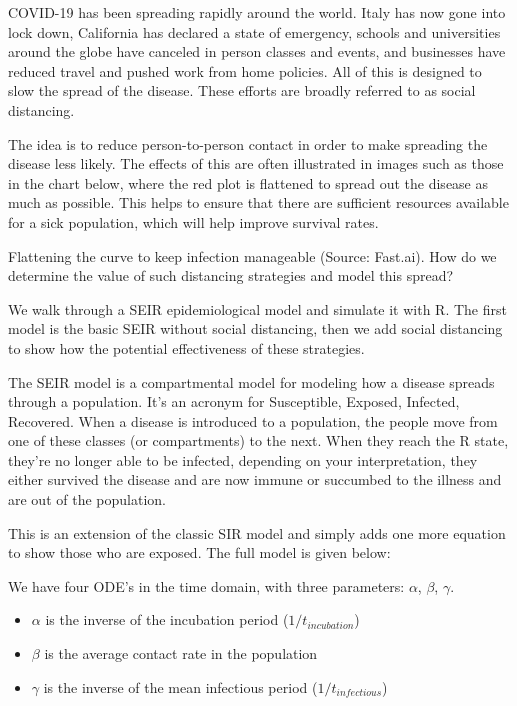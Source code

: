\documentclass{article}\usepackage[]{graphicx}\usepackage[]{color}
\begin{document}
COVID-19 has been spreading rapidly around the world. Italy has now gone into lock down, California has declared a state of emergency, schools and universities around the globe have canceled in person classes and events, and businesses have reduced travel and pushed work from home policies. All of this is designed to slow the spread of the disease. These efforts are broadly referred to as social distancing.

The idea is to reduce person-to-person contact in order to make spreading the disease less likely. The effects of this are often illustrated in images such as those in the chart below, where the red plot is flattened to spread out the disease as much as possible. This helps to ensure that there are sufficient resources available for a sick population, which will help improve survival rates.

Flattening the curve to keep infection manageable (Source: Fast.ai).
How do we determine the value of such distancing strategies and model this spread?


We walk through a SEIR epidemiological model and simulate it with R. The first model is the basic SEIR without social distancing, then we add social distancing to show how the potential effectiveness of these strategies.

The SEIR model is a compartmental model for modeling how a disease spreads through a population. It’s an acronym for Susceptible, Exposed, Infected, Recovered. When a disease is introduced to a population, the people move from one of these classes (or compartments) to the next. When they reach the R state, they’re no longer able to be infected, depending on your interpretation, they either survived the disease and are now immune or succumbed to the illness and are out of the population.

This is an extension of the classic SIR model and simply adds one more equation to show those who are exposed. The full model is given below:

We have four ODE's in the time domain, with three parameters: $\alpha$, $\beta$, $\gamma$.

\begin{itemize}

\item $\alpha$ is the inverse of the incubation period ($1/t_{incubation}$)
\item $\beta$ is the average contact rate in the population
\item $\gamma$ is the inverse of the mean infectious period ($1/t_{infectious}$)

\end{itemize}
\end{document}
